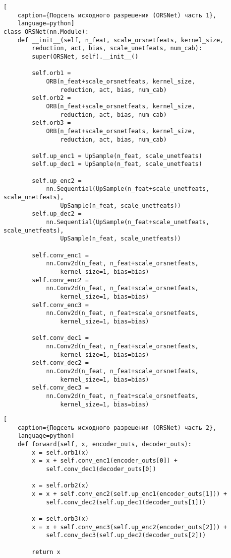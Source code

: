 \begin{lstlisting}[
    caption={Подсеть исходного разрешения (ORSNet) часть 1},
    language=python]
class ORSNet(nn.Module):
    def __init__(self, n_feat, scale_orsnetfeats, kernel_size, 
        reduction, act, bias, scale_unetfeats, num_cab):
        super(ORSNet, self).__init__()

        self.orb1 = 
            ORB(n_feat+scale_orsnetfeats, kernel_size, 
                reduction, act, bias, num_cab)
        self.orb2 = 
            ORB(n_feat+scale_orsnetfeats, kernel_size, 
                reduction, act, bias, num_cab)
        self.orb3 = 
            ORB(n_feat+scale_orsnetfeats, kernel_size, 
                reduction, act, bias, num_cab)

        self.up_enc1 = UpSample(n_feat, scale_unetfeats)
        self.up_dec1 = UpSample(n_feat, scale_unetfeats)

        self.up_enc2 = 
            nn.Sequential(UpSample(n_feat+scale_unetfeats, scale_unetfeats), 
                UpSample(n_feat, scale_unetfeats))
        self.up_dec2 = 
            nn.Sequential(UpSample(n_feat+scale_unetfeats, scale_unetfeats), 
                UpSample(n_feat, scale_unetfeats))

        self.conv_enc1 = 
            nn.Conv2d(n_feat, n_feat+scale_orsnetfeats, 
                kernel_size=1, bias=bias)
        self.conv_enc2 = 
            nn.Conv2d(n_feat, n_feat+scale_orsnetfeats, 
                kernel_size=1, bias=bias)
        self.conv_enc3 = 
            nn.Conv2d(n_feat, n_feat+scale_orsnetfeats, 
                kernel_size=1, bias=bias)

        self.conv_dec1 = 
            nn.Conv2d(n_feat, n_feat+scale_orsnetfeats, 
                kernel_size=1, bias=bias)
        self.conv_dec2 = 
            nn.Conv2d(n_feat, n_feat+scale_orsnetfeats, 
                kernel_size=1, bias=bias)
        self.conv_dec3 = 
            nn.Conv2d(n_feat, n_feat+scale_orsnetfeats, 
                kernel_size=1, bias=bias)
\end{lstlisting}

\newpage

\begin{lstlisting}[
    caption={Подсеть исходного разрешения (ORSNet) часть 2},
    language=python]
    def forward(self, x, encoder_outs, decoder_outs):
        x = self.orb1(x)
        x = x + self.conv_enc1(encoder_outs[0]) + 
            self.conv_dec1(decoder_outs[0])

        x = self.orb2(x)
        x = x + self.conv_enc2(self.up_enc1(encoder_outs[1])) + 
            self.conv_dec2(self.up_dec1(decoder_outs[1]))

        x = self.orb3(x)
        x = x + self.conv_enc3(self.up_enc2(encoder_outs[2])) + 
            self.conv_dec3(self.up_dec2(decoder_outs[2]))

        return x
\end{lstlisting}

